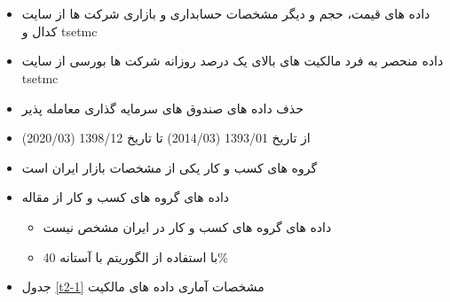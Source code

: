 \section{}



\subsection{}
\begin{itemize}
	\item 
	داده های قیمت، حجم و دیگر مشخصات حسابداری و بازاری شرکت ها از سایت کدال و tsetmc
	\item
	داده منحصر به فرد مالکیت های بالای یک درصد روزانه شرکت ها بورسی از سایت 
	tsetmc
	\item 
	حذف داده های صندوق های سرمایه گذاری معامله پذیر
	\item 
	از تاریخ 
	1393/01 (2014/03)
	 تا تاریخ 
	 1398/12 (2020/03)
	 

	\item 
	گروه های کسب و کار یکی از مشخصات بازار ایران است
		\item 
	داده های گروه های کسب و کار از مقاله
	\begin{itemize}
		\item 
		داده های گروه های کسب و کار در ایران مشخص نیست
		\item
		با استفاده از الگوریتم 
		با آستانه 40\%
		
	\end{itemize}
	\item
	جدول 
	\ref{t2-1}
	مشخصات آماری داده های مالکیت
\end{itemize}


\begin{LTR}
\end{LTR}



